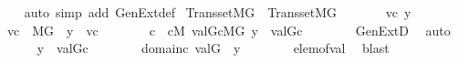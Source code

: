 \begin{isabellebody}
%
\isadelimproof
\ \ %
\endisadelimproof
%
\isatagproof
{}\isamarkupfalse%
\ {\isacharparenleft}{\kern0pt}auto\ simp\ add{\isacharcolon}{\kern0pt}\ GenExt{\isacharunderscore}{\kern0pt}def{\isacharparenright}{\kern0pt}%
\endisatagproof
{\isafoldproof}%
%
\isadelimproof
\isanewline
%
\endisadelimproof
\isanewline
{}\isamarkupfalse%
\ Transset{\isacharunderscore}{\kern0pt}MG\ {\isacharcolon}{\kern0pt}\ {\isachardoublequoteopen}Transset{\isacharparenleft}{\kern0pt}M{\isacharbrackleft}{\kern0pt}G{\isacharbrackright}{\kern0pt}{\isacharparenright}{\kern0pt}{\isachardoublequoteclose}\isanewline
%
\isadelimproof
%
\endisadelimproof
%
\isatagproof
{}\isamarkupfalse%
\ {\isacharminus}{\kern0pt}\isanewline
\ \ \isacommand{{\isacharbraceleft}{\kern0pt}}\isamarkupfalse%
\ \isamarkupfalse%
\ vc\ y\isanewline
\ \ \ \ \isamarkupfalse%
\ {\isachardoublequoteopen}vc\ {\isasymin}\ M{\isacharbrackleft}{\kern0pt}G{\isacharbrackright}{\kern0pt}{\isachardoublequoteclose}\ \ {\isachardoublequoteopen}y\ {\isasymin}\ vc{\isachardoublequoteclose}\isanewline
\ \ \ \ \isamarkupfalse%
\ \isamarkupfalse%
\ c\ \ {\isachardoublequoteopen}c{\isasymin}M{\isachardoublequoteclose}\ {\isachardoublequoteopen}val{\isacharparenleft}{\kern0pt}G{\isacharcomma}{\kern0pt}c{\isacharparenright}{\kern0pt}{\isasymin}M{\isacharbrackleft}{\kern0pt}G{\isacharbrackright}{\kern0pt}{\isachardoublequoteclose}\ {\isachardoublequoteopen}y\ {\isasymin}\ val{\isacharparenleft}{\kern0pt}G{\isacharcomma}{\kern0pt}c{\isacharparenright}{\kern0pt}{\isachardoublequoteclose}\isanewline
\ \ \ \ \ \ \isamarkupfalse%
\ GenExtD\ \isamarkupfalse%
\ auto\isanewline
\ \ \ \ \isamarkupfalse%
\ {\isacartoucheopen}y\ {\isasymin}\ val{\isacharparenleft}{\kern0pt}G{\isacharcomma}{\kern0pt}c{\isacharparenright}{\kern0pt}{\isacartoucheclose}\isanewline
\ \ \ \ \isamarkupfalse%
\ {\isasymtheta}\ \ {\isachardoublequoteopen}{\isasymtheta}{\isasymin}domain{\isacharparenleft}{\kern0pt}c{\isacharparenright}{\kern0pt}{\isachardoublequoteclose}\ {\isachardoublequoteopen}val{\isacharparenleft}{\kern0pt}G{\isacharcomma}{\kern0pt}{\isasymtheta}{\isacharparenright}{\kern0pt}\ {\isacharequal}{\kern0pt}\ y{\isachardoublequoteclose}\isanewline
\ \ \ \ \ \ \isamarkupfalse%
\ elem{\isacharunderscore}{\kern0pt}of{\isacharunderscore}{\kern0pt}val\ \isamarkupfalse%
\ blast\isanewline
\ \ \ \ \isamarkupfalse%

\end{isabellebody}
